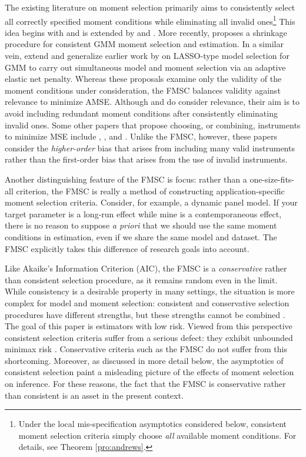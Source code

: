 The existing literature on moment selection primarily aims to consistently select all correctly specified moment conditions while eliminating all invalid ones\footnote{Under the local mis-specification asymptotics considered below, consistent moment selection criteria simply choose \emph{all} available moment conditions. For details, see Theorem \ref{pro:andrews}.}
This idea begins with \cite{Andrews1999} and is extended by  \cite{AndrewsLu} and \cite{HongPrestonShum}.
More recently, \cite{Liao} proposes a shrinkage procedure for consistent GMM moment selection and estimation. 
In a similar vein, \cite{CanerHanLee} extend and generalize earlier work by \cite{Caner2009} on LASSO-type model selection for GMM to carry out simultaneous model and moment selection via an adaptive elastic net penalty. 
Whereas these proposals examine only the validity of the moment conditions under consideration, the FMSC balances validity against relevance to minimize AMSE.
Although \cite{HallPeixe2003} and \cite{ChengLiao} do consider relevance, their aim is to avoid including redundant moment conditions after consistently eliminating invalid ones.
Some other papers that propose choosing, or combining, instruments to minimize MSE include \cite{DonaldNewey2001}, \cite{DonaldImbensNewey2009}, and \cite{KuersteinerOkui2010}.
Unlike the FMSC, however, these papers consider the \emph{higher-order} bias that arises from including many valid instruments rather than the first-order bias that arises from the use of invalid instruments.

Another distinguishing feature of the FMSC is focus: rather than a one-size-fits-all criterion, the FMSC is really a method of constructing application-specific moment selection criteria.
Consider, for example, a dynamic panel model.
If your target parameter is a long-run effect while mine is a contemporaneous effect, there is no reason to suppose \emph{a priori} that we should use the same moment conditions in estimation, even if we share the same model and dataset.
The FMSC explicitly takes this difference of research goals into account.

Like Akaike's Information Criterion (AIC), the FMSC is a \emph{conservative} rather than consistent selection procedure, as it remains random even in the limit.	
While consistency is a desirable property in many settings, the situation is more complex for model and moment selection: consistent and conservative selection procedures have different strengths, but these strengths cannot be combined \citep{Yang2005}.
The goal of this paper is estimators with low risk.
Viewed from this perspective consistent selection criteria suffer from a serious defect: they exhibit unbounded minimax risk \citep{LeebPoetscher2008}.  
Conservative criteria such as the FMSC do not suffer from this shortcoming.
Moreover, as discussed in more detail below, the asymptotics of consistent selection paint a misleading picture of the effects of moment selection on inference.
For these reasons, the fact that the FMSC is conservative rather than consistent is an asset in the present context.

